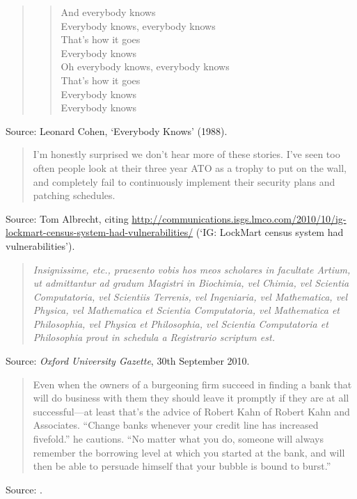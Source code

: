 \documentclass[a4paper]{article}
\begin{document}
\begin{quote}
\begin{verse}
\begin{centering}
			And everybody knows \\
		\vspace{.1in}
			Everybody knows, everybody knows \\
			That's how it goes \\
			Everybody knows \\
		\vspace{.1in}
			Oh everybody knows, everybody knows \\
			That's how it goes \\
			Everybody knows \\
		\vspace{.1in}
			Everybody knows \\
		\end{centering}
	\end{verse}
\end{quote}
Source: Leonard Cohen, `Everybody Knows' (1988).
\medskip

\begin{quote}
	I'm honestly surprised we don't hear more of these stories.  I've
	seen too often people look at their three year ATO as a trophy to
	put on the wall, and completely fail to continuously implement their
	security plans and patching schedules.
\end{quote}
Source: Tom Albrecht, citing \url{http://communications.isgs.lmco.com/2010/10/ig-lockmart-census-system-had-vulnerabilities/} (`IG: LockMart census system had vulnerabilities').
\medskip

\begin{quote}
	{\it Insignissime, etc., praesento vobis hos meos scholares in
	facultate Artium, ut admittantur ad gradum Magistri in Biochimia,
	vel Chimia, vel Scientia Computatoria, vel Scientiis Terrenis,
	vel Ingeniaria, vel Mathematica, vel Physica, vel Mathematica
	et Scientia Computatoria, vel Mathematica et Philosophia, vel
	Physica et Philosophia, vel Scientia Computatoria et Philosophia
	prout in schedula a Registrario scriptum est.}
\end{quote}
Source: \emph{Oxford University Gazette}, 30th September 2010.
\medskip

\begin{quote}
	Even when the owners of a burgeoning firm succeed in finding a
	bank that will do business with them they should leave it promptly
	if they are at all successful---at least that's the advice
	of Robert Kahn of Robert Kahn and Associates.  ``Change banks
	whenever your credit line has increased fivefold.'' he cautions.
	``No matter what you do, someone will always remember the
	borrowing level at which you started at the bank, and will then
	be able to persuade himself that your bubble is bound to burst.''
\end{quote}
Source: \citet[p.~131]{Augustine1997}.
\medskip
\end{document}
